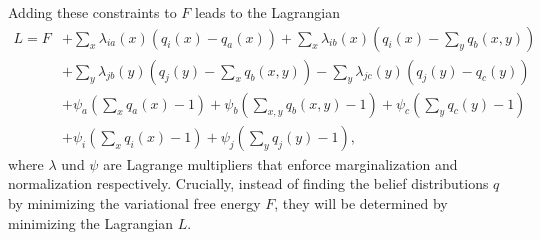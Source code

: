 \vspace{1em}
Adding these constraints to \(F\) leads to the Lagrangian
\begin{equation}
    \begin{split}
        L = F & + \sum_x \lambda_{ia}(x) (q_i(x) - q_a(x)) + \sum_x \lambda_{ib}(x) (q_i(x) - \sum_y q_b(x,y)) \\
              & + \sum_y \lambda_{jb}(y) (q_j(y) - \sum_x q_b(x,y)) - \sum_y \lambda_{jc}(y) (q_j(y) - q_c(y)) \\
              & + \psi_a (\sum_x q_a(x) - 1) + \psi_b (\sum_{x,y} q_b(x,y) - 1) + \psi_c (\sum_y q_c(y) - 1)   \\
              & + \psi_i (\sum_x q_i(x) - 1) + \psi_j (\sum_y q_j(y) - 1),
    \end{split}
\end{equation}
where \(\lambda\) und \(\psi\) are Lagrange multipliers that enforce marginalization and normalization respectively. Crucially, instead of finding the belief distributions \(q\) by minimizing the variational free energy \(F\), they will be determined by minimizing the Lagrangian \(L\).

